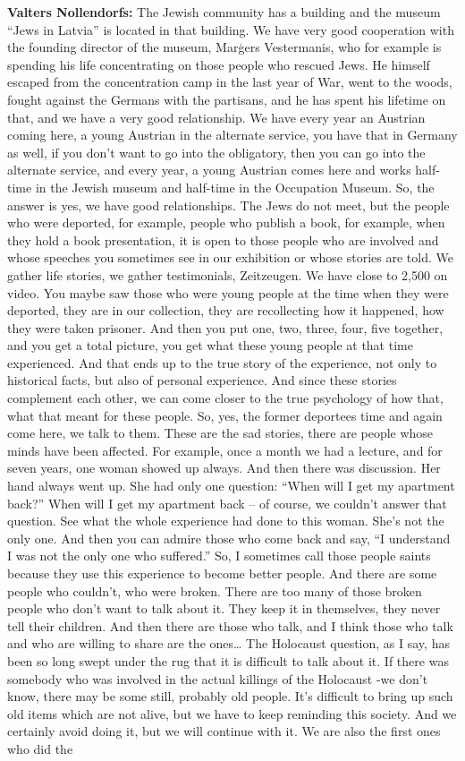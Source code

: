 \textbf{Valters Nollendorfs:} The Jewish community has a building and the museum ``Jews in Latvia'' is located in that building. We have very good cooperation with the founding director of the museum, Marģers Vestermanis, who for example is spending his life concentrating on those people who rescued Jews. He himself escaped from the concentration camp in the last year of War, went to the woods, fought against the Germans with the partisans, and he has spent his lifetime on that, and we have a very good relationship. We have every year an Austrian coming here, a young Austrian in the alternate service, you have that in Germany as well, if you don't want to go into the obligatory, then you can go into the alternate service, and every year, a young Austrian comes here and works half-time in the Jewish museum and half-time in the Occupation Museum. So, the answer is yes, we have good relationships. The Jews do not meet, but the people who were deported, for example, people who publish a book, for example, when they hold a book presentation, it is open to those people who are involved and whose speeches you sometimes see in our exhibition or whose stories are told. We gather life stories, we gather testimonials, Zeitzeugen. We have close to 2,500 on video. You maybe saw those who were young people at the time when they were deported, they are in our collection, they are recollecting how it happened, how they were taken prisoner. And then you put one, two, three, four, five together, and you get a total picture, you get what these young people at that time experienced. And that ends up to the true story of the experience, not only to historical facts, but also of personal experience. And since these stories complement each other, we can come closer to the true psychology of how that, what that meant for these people. So, yes, the former deportees time and again come here, we talk to them. These are the sad stories, there are people whose minds have been affected. For example, once a month we had a lecture, and for seven years, one woman showed up always. And then there was discussion. Her hand always went up. She had only one question: ``When will I get my apartment back?'' When will I get my apartment back – of course, we couldn’t answer that question. See what the whole experience had done to this woman. She’s not the only one. And then you can admire those who come back and say, ``I understand I was not the only one who suffered.'' So, I sometimes call those people saints because they use this experience to become better people. And there are some people who couldn’t, who were broken. There are too many of those broken people who don’t want to talk about it. They keep it in themselves, they never tell their children. And then there are those who talk, and I think those who talk and who are willing to share are the ones… The Holocaust question, as I say, has been so long swept under the rug that it is difficult to talk about it. If there was somebody who was involved in the actual killings of the Holocaust -we don’t know, there may be some still, probably old people. It’s difficult to bring up such old items which are not alive, but we have to keep reminding this society. And we certainly avoid doing it, but we will continue with it. We are also the first ones who did the 